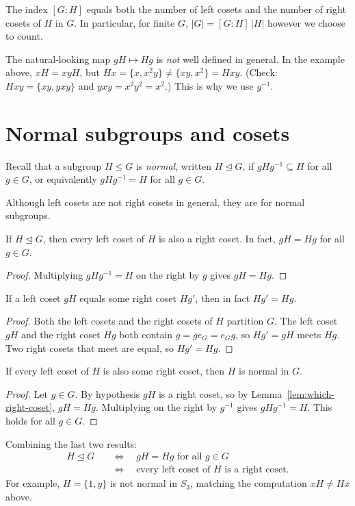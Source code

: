 \documentclass[reqno,11pt]{amsart}
\begin{document}
\begin{corollary}
The index $[G:H]$ equals both the number of left cosets and the number of
right cosets of $H$ in $G$. In particular, for finite $G$,
$|G|=[G:H]\,|H|$ however we choose to count.
\end{corollary}

\begin{warningbox}
The natural-looking map $gH\mapsto Hg$ is \emph{not} well defined in
general. In the example above, $xH=xyH$, but
$Hx=\{x,x^2y\}\neq\{xy,x^2\}=Hxy$. (Check: $Hxy=\{xy,yxy\}$ and
$yxy=x^2y^2=x^2$.) This is why we use $g^{-1}$.
\end{warningbox}

\section{Normal subgroups and cosets}

Recall that a subgroup $H\leq G$ is \emph{normal}, written
$H\trianglelefteq G$, if $gHg^{-1}\subseteq H$ for all $g\in G$, or
equivalently $gHg^{-1}=H$ for all $g\in G$.

Although left cosets are not right cosets in general, they are for normal
subgroups.

\begin{lemma}\label{lem:normal-left-right}
If $H\trianglelefteq G$, then every left coset of $H$ is also a right
coset. In fact, $gH=Hg$ for all $g\in G$.
\end{lemma}
\begin{proof}
Multiplying $gHg^{-1}=H$ on the right by $g$ gives $gH=Hg$.
\end{proof}

\begin{lemma}\label{lem:which-right-coset}
If a left coset $gH$ equals some right coset $Hg'$, then in fact
$Hg'=Hg$.
\end{lemma}
\begin{proof}
Both the left cosets and the right cosets of $H$ partition $G$. The left
coset $gH$ and the right coset $Hg$ both contain $g=ge_G=e_Gg$, so
$Hg'=gH$ meets $Hg$. Two right cosets that meet are equal, so $Hg'=Hg$.
\end{proof}

\begin{corollary}
If every left coset of $H$ is also some right coset, then $H$ is normal
in $G$.
\end{corollary}
\begin{proof}
Let $g\in G$. By hypothesis $gH$ is a right coset, so by
Lemma~\ref{lem:which-right-coset}, $gH=Hg$. Multiplying on the right by
$g^{-1}$ gives $gHg^{-1}=H$. This holds for all $g\in G$.
\end{proof}

Combining the last two results:
\begin{align*}
  H\trianglelefteq G
  &\quad\Longleftrightarrow\quad gH=Hg\text{ for all }g\in G\\
  &\quad\Longleftrightarrow\quad
  \text{every left coset of $H$ is a right coset.}
\end{align*}
For example, $H=\{1,y\}$ is not normal in $S_3$, matching the computation
$xH\neq Hx$ above.
\end{document}
